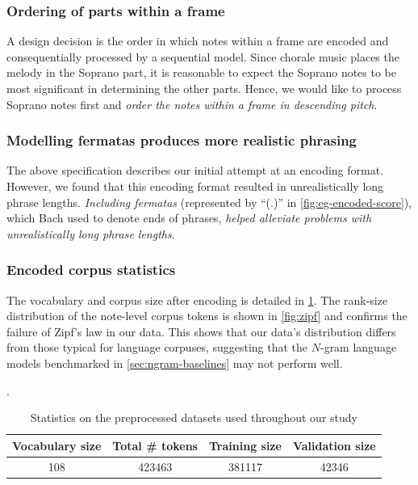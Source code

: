 \subsubsection{Ordering of parts within a frame}\label{sec:ordering-notes-within-frame}

A design decision is the order in which notes within a frame are encoded and
consequentially processed by a sequential model. Since chorale music places the
melody in the Soprano part, it is reasonable to expect the Soprano notes to be
most significant in determining the other parts. Hence, we would like to process
Soprano notes first and \emph{order the notes within a frame in descending pitch}.

\subsubsection{Modelling fermatas produces more realistic phrasing}

The above specification describes our initial attempt at an encoding format.
However, we found that this encoding format resulted in unrealistically long
phrase lengths. \emph{Including fermatas} (represented by ``(.)'' in
\vref{fig:eg-encoded-score}), which Bach used to denote ends of phrases,
\emph{helped alleviate problems with unrealistically long phrase lengths}.

\subsubsection{Encoded corpus statistics}

The vocabulary and corpus size after encoding is detailed in
\cref{tab:encoded-corpus-stats}. The rank-size distribution of the note-level
corpus tokens is shown in \cref{fig:zipf} and confirms the failure of Zipf's
law in our data. This shows that our data's distribution differs from those
typical for language corpuses, suggesting that the $N$-gram language models
benchmarked in \vref{sec:ngram-baselines} may not perform well.

\begin{table}[tb]
  \centering
  \caption{Statistics on the preprocessed datasets used throughout our study}
  \label{tab:encoded-corpus-stats}.
  \begin{tabular}{c c c c}
    \toprule
    Vocabulary size & Total \# tokens & Training size & Validation size \\
    \midrule
    108 & 423463 & 381117 & 42346 \\
    \bottomrule
  \end{tabular}
\end{table}


